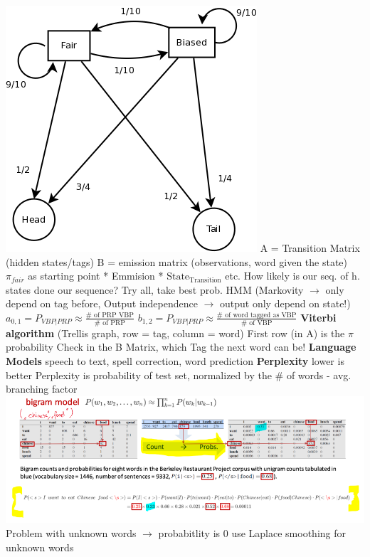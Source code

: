 \documentclass[8pt]{extarticle}
\begin{document}
\begin{multicols*}{3}
\includegraphics[width=0.4\columnwidth]{fairbet}
\newline A = Transition Matrix (hidden states/tags) B = emission matrix (observations, word given the state)
\newline $\pi_{fair}$ as starting point * Emmision * $\textrm{State}_{\textrm{Transition}}$ etc. How likely is our seq. of h. states done our sequence? Try all, take best prob.
\newline HMM (Markovity $\rightarrow$ only depend on tag before, Output independence $\rightarrow$ output only depend on state!)
\newline $a_{0,1} = P_{VBP|PRP} \approx \frac{\textrm{# of PRP VBP}}{\textrm{# of PRP}}$
\newline $b_{1,2} = P_{VBP|PRP} \approx \frac{\textrm{# of word tagged as VBP}}{\textrm{# of VBP}}$
\newline \textbf{Viterbi algorithm} (Trellis graph, row = tag, column = word)
\newline First row (in A) is the $\pi$ probability
\newline Check in the B Matrix, which Tag the next word can be!
\newline \textbf{Language Models} speech to text, spell correction, word prediction
\newline \textbf{Perplexity } lower is better 
\newline Perplexity is probability of test set, normalized by the \# of words - avg. branching factor
\includegraphics[width=\columnwidth]{bigram_model}
Problem with unknown words $\rightarrow$ probabitlity is 0
\newline use Laplace smoothing for unknown words


\end{multicols*}
\end{document}
